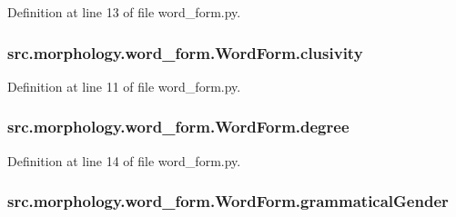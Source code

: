 Definition at line 13 of file word\+\_\+form.\+py.

\hypertarget{classsrc_1_1morphology_1_1word__form_1_1_word_form_a04e4f04ce56e4a9628b8ceea29b4573c}{
\subsubsection[{clusivity}]{\setlength{\rightskip}{0pt plus 5cm}src.\+morphology.\+word\+\_\+form.\+Word\+Form.\+clusivity}}\label{classsrc_1_1morphology_1_1word__form_1_1_word_form_a04e4f04ce56e4a9628b8ceea29b4573c}


Definition at line 11 of file word\+\_\+form.\+py.

\hypertarget{classsrc_1_1morphology_1_1word__form_1_1_word_form_adf2ee9bb3f0c2618cb4aaa6065300531}{
\subsubsection[{degree}]{\setlength{\rightskip}{0pt plus 5cm}src.\+morphology.\+word\+\_\+form.\+Word\+Form.\+degree}}\label{classsrc_1_1morphology_1_1word__form_1_1_word_form_adf2ee9bb3f0c2618cb4aaa6065300531}


Definition at line 14 of file word\+\_\+form.\+py.

\hypertarget{classsrc_1_1morphology_1_1word__form_1_1_word_form_a44467b3575140671b680bca5ee0b0483}{
\subsubsection[{grammatical\+Gender}]{\setlength{\rightskip}{0pt plus 5cm}src.\+morphology.\+word\+\_\+form.\+Word\+Form.\+grammatical\+Gender}}\label{classsrc_1_1morphology_1_1word__form_1_1_word_form_a44467b3575140671b680bca5ee0b0483}


